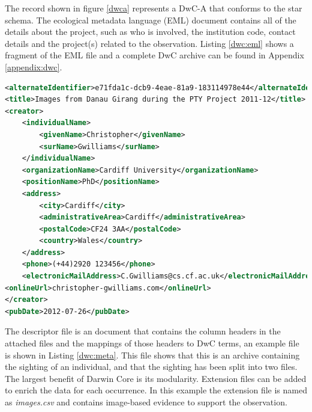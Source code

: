 
The record shown in figure \ref{dwca} represents a DwC-A that conforms to the star schema. The ecological metadata language (EML) document contains all of the details about the project, such as who is involved, the institution code, contact details and the project(s) related to the observation. Listing \ref{dwc:eml} shows a fragment of the EML file and a complete DwC archive can be found in Appendix \ref{appendix:dwc}.
\vspace{\baselineskip}
% 
\begin{lstlisting}[caption=Darwin Core Ecological Metadata File Fragment, label=dwc:eml, breaklines=true, language=XML]
<alternateIdentifier>e71fda1c-dcb9-4eae-81a9-183114978e44</alternateIdentifier>
<title>Images from Danau Girang during the PTY Project 2011-12</title>
<creator>
	<individualName>
		<givenName>Christopher</givenName>
		<surName>Gwilliams</surName>
	</individualName>
	<organizationName>Cardiff University</organizationName>
	<positionName>PhD</positionName>
	<address>
		<city>Cardiff</city>
		<administrativeArea>Cardiff</administrativeArea>
		<postalCode>CF24 3AA</postalCode>
		<country>Wales</country>
	</address>
	<phone>(+44)2920 123456</phone>
	<electronicMailAddress>C.Gwilliams@cs.cf.ac.uk</electronicMailAddress>
<onlineUrl>christopher-gwilliams.com</onlineUrl>
</creator>
<pubDate>2012-07-26</pubDate>
 \end{lstlisting}

The descriptor file is an \DIFdelbegin {}\DIFdelend \DIFaddbegin {}\DIFaddend document that contains the column headers in the attached files and the mappings of those headers to DwC terms, an example file is shown in Listing \ref{dwc:meta}. This file shows that this is an archive containing the sighting of an individual, and that the sighting has been split into two files. The largest benefit of Darwin Core is its modularity. Extension files can be added to enrich the data for each occurrence. In this example the extension file is named as \textit{images.csv} and contains image-based evidence to support the observation.

\noindent\begin{minipage}{\textwidth}

\end{minipage}

